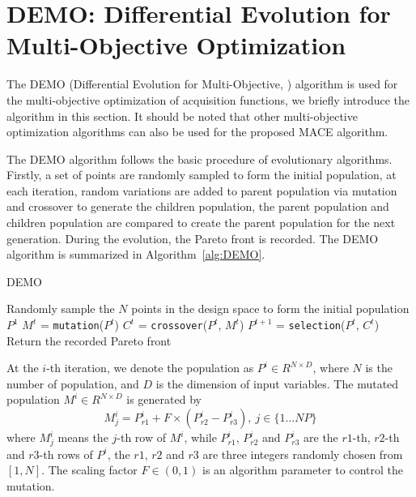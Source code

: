 \section{DEMO: Differential Evolution for Multi-Objective Optimization}

The DEMO (Differential Evolution for Multi-Objective, \citet{demo}) algorithm is used for the multi-objective optimization of acquisition functions, we briefly introduce the algorithm in this section. It should be noted that other multi-objective optimization algorithms can also be used for the proposed MACE algorithm. 

The DEMO algorithm follows the basic procedure of evolutionary algorithms. Firstly, a set of points are randomly sampled to form the initial population, at each iteration, random variations are added to parent population via mutation and crossover to generate the children population, the parent population and children population are compared to create the parent population for the next generation. During the evolution, the Pareto front is recorded. The DEMO algorithm is summarized in Algorithm~\ref{alg:DEMO}.

\begin{algorithm}[h]
    \caption{DEMO}
    \label{alg:DEMO}
    \begin{algorithmic}[1]
        \STATE Randomly sample the $N$ points in the design space to form the initial population $P^1$
            \STATE $M^t$     = \texttt{mutation}($P^t$)
            \STATE $C^t$     = \texttt{crossover}($P^t$, $M^t$)
            \STATE $P^{t+1}$ = \texttt{selection}($P^t$, $C^t$)
        \ENDFOR
        \STATE Return the recorded Pareto front
    \end{algorithmic}
\end{algorithm}

At the $i$-th iteration, we denote the population as $P^i \in R^{N \times D}$, where $N$ is the number of population, and $D$ is the dimension of input variables. The mutated population $M^i \in R^{N \times D}$ is generated by 
\begin{equation}
    \label{eq:DEMO_mutation}
    M^i_j = P^i_{r1} + F \times (P^i_{r2} - P^i_{r3}),~j \in \{1 \dots NP\}
\end{equation}
where $M^i_j$ means the $j$-th row of $M^i$, while $P^i_{r1}$, $P^i_{r2}$ and $P^i_{r3}$ are the $\mathit{r1}$-th, $\mathit{r2}$-th and $\mathit{r3}$-th rows of $P^i$, the $r1$, $r2$ and $r3$ are three integers randomly chosen from $[1, N]$. The scaling factor $F \in (0, 1)$ is an algorithm parameter to control the mutation.

